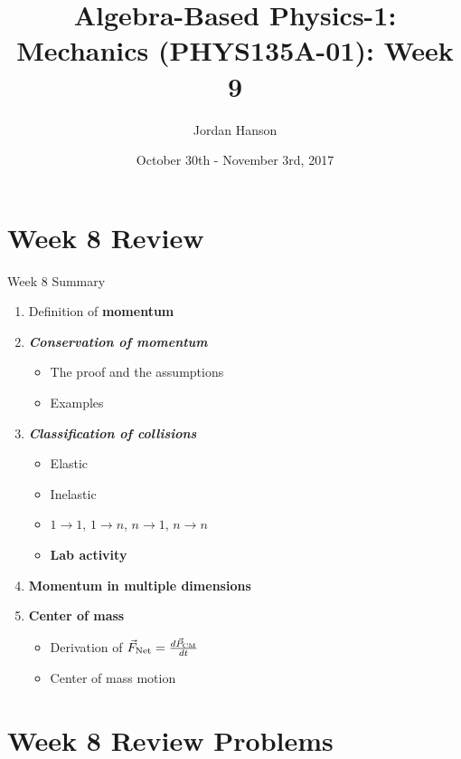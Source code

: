 \documentclass{beamer}
\title{Algebra-Based Physics-1: Mechanics (PHYS135A-01): Week 9}
\date{October 30th - November 3rd, 2017}
\author{Jordan Hanson}
\institute{Whittier College Department of Physics and Astronomy}
\begin{document}
\maketitle

\section{Week 8 Review}

\begin{frame}{Week 8 Summary}
\begin{enumerate}
\item Definition of \alert{\textbf{momentum}}
\item \alert{\textbf{\textit{Conservation of momentum}}}
\begin{itemize}
\item The proof and the assumptions
\item Examples
\end{itemize}
\item \alert{\textbf{\textit{Classification of collisions}}}
\begin{itemize}
\item Elastic
\item Inelastic
\item $1 \rightarrow 1$, $1 \rightarrow n$, $n \rightarrow 1$, $n \rightarrow n$
\item \textbf{Lab activity}
\end{itemize}
\item \textbf{Momentum in multiple dimensions}
\item \textbf{Center of mass}
\begin{itemize}
\item Derivation of $\vec{F}_{\rm Net} = \frac{d\vec{P}_{\rm CM}}{dt}$
\item Center of mass motion
\end{itemize}
\end{enumerate}
\end{frame}

\section{Week 8 Review Problems}
\end{document}
